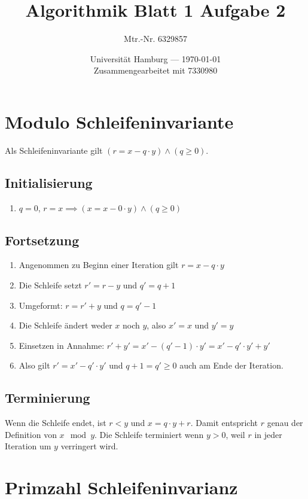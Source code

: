 \documentclass[parskip=half,a4paper]{scrartcl}
\title{Algorithmik Blatt 1 Aufgabe 2}
\author{Mtr.-Nr. 6329857}
\date{Universität Hamburg --- \today \\ Zusammengearbeitet mit 7330980}
\begin{document}
\maketitle

\section*{Modulo Schleifeninvariante}

Als Schleifeninvariante gilt $(r = x - q \cdot y) \land (q \ge 0)$.

\subsection*{Initialisierung}

\begin{enumerate}
	\item $q = 0$, $r = x \implies (x = x - 0 \cdot y) \land (q \ge 0)$
\end{enumerate}

\subsection*{Fortsetzung}

\begin{enumerate}
	\item Angenommen zu Beginn einer Iteration gilt $r = x - q \cdot y$
	\item Die Schleife setzt $r' = r - y$ und $q' = q + 1$
	\item Umgeformt: $r = r' + y$ und $q = q' - 1$
	\item Die Schleife ändert weder $x$ noch $y$, also $x' = x$ und $y' = y$
	\item Einsetzen in Annahme: $r' + y' = x' - (q' - 1) \cdot y' = x' - q' \cdot y' + y'$
	\item Also gilt $r' = x' - q' \cdot y'$ und $q + 1 = q' \ge 0$ auch am Ende der Iteration.
\end{enumerate}

\subsection*{Terminierung}

Wenn die Schleife endet, ist $r < y$ und $x = q \cdot y + r$. Damit entspricht $r$ genau der Definition von $x \mod y$. Die Schleife terminiert wenn $y > 0$, weil $r$ in jeder Iteration um $y$ verringert wird.

\section*{Primzahl Schleifeninvarianz}
\end{document}
